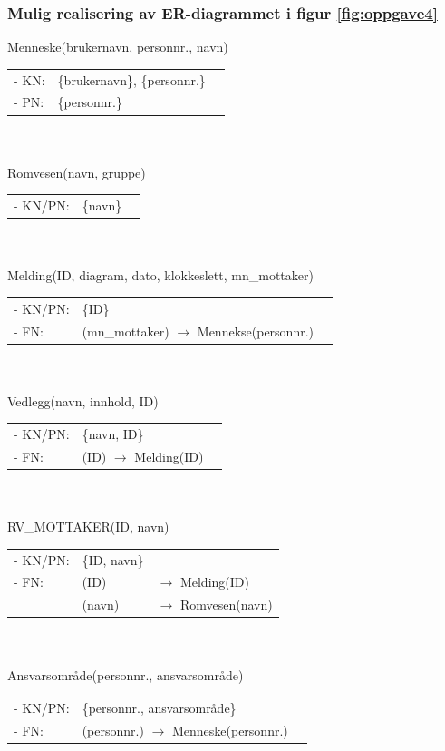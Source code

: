 \documentclass{article}
\begin{document}
\subsubsection*{Mulig realisering av ER-diagrammet i figur \ref{fig:oppgave4}}
Menneske(brukernavn, personnr., navn) \\
\begin{tabular}{l l l}
    - KN: & \{brukernavn\}, \{personnr.\} \\
    - PN: & \{personnr.\} \\
\end{tabular}\\
\\
Romvesen(navn, gruppe)\\
\begin{tabular}{l l l}    
    - KN/PN: & \{navn\} \\ 
\end{tabular}\\
\\
Melding(ID, diagram, dato, klokkeslett, mn\_mottaker) \\
\begin{tabular}{l l l}
    - KN/PN: & \{ID\} \\
    - FN: & (mn\_mottaker) \(\rightarrow\) Mennekse(personnr.)\\
\end{tabular}\\
\\
Vedlegg(navn, innhold, ID)\\
\begin{tabular}{l l l}
    - KN/PN: & \{navn, ID\}\\
    - FN: & (ID) \(\rightarrow\) Melding(ID)\\
\end{tabular}\\
\\
RV\_MOTTAKER(ID, navn)\\
\begin{tabular}{l l l}
    - KN/PN: & \{ID, navn\}\\
    - FN: & (ID)   & \(\rightarrow\) Melding(ID) \\
          & (navn) & \(\rightarrow\) Romvesen(navn) \\
\end{tabular}\\
\\
Ansvarsområde(personnr., ansvarsområde)\\
\begin{tabular}{l l l}
   - KN/PN: & \{personnr., ansvarsområde\} \\
   - FN: & (personnr.)  \(\rightarrow\) Menneske(personnr.)\\
\end{tabular} \\
\end{document}
